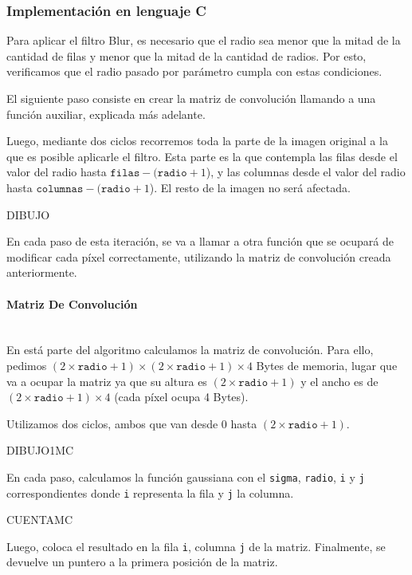     \subsubsection{Implementación en lenguaje C}

      Para aplicar el filtro Blur, es necesario que el radio sea menor que la mitad de la cantidad de filas y menor que la mitad de la cantidad de radios. Por esto, verificamos que el radio pasado por parámetro cumpla con estas condiciones.
      
      El siguiente paso consiste en crear la matriz de convolución llamando a una función auxiliar, explicada más adelante. 

      Luego, mediante dos ciclos recorremos toda la parte de  la imagen original a la que es posible aplicarle el filtro. Esta parte es la que contempla las filas desde el valor del radio hasta $\mathtt{filas} - (\mathtt{radio} + 1$), y las columnas desde el valor del radio hasta $\mathtt{columnas} - (\mathtt{radio} + 1$). El resto de la imagen no será afectada. 

      DIBUJO

      En cada paso de esta iteración, se va a llamar a otra función que se ocupará de modificar cada píxel correctamente, utilizando la matriz de convolución creada anteriormente. 

      \paragraph{Matriz De Convolución} \mbox{} \\
        En está parte del algoritmo calculamos la matriz de convolución. Para ello, pedimos $(2 \times \mathtt{radio} + 1) \times (2 \times \mathtt{radio} + 1) \times 4$ Bytes de memoria, lugar que va a ocupar la matriz ya que su altura es $(2 \times \mathtt{radio} + 1)$ y el ancho es de $(2 \times \mathtt{radio} + 1) \times 4$ (cada píxel ocupa 4 Bytes).
        
        Utilizamos dos ciclos, ambos que van desde 0 hasta $(2 \times \mathtt{radio} + 1)$. 
        
        DIBUJO1MC

        En cada paso, calculamos la función gaussiana con el \texttt{sigma}, \texttt{radio}, \texttt{i} y \texttt{j} correspondientes donde \texttt{i} representa la fila y \texttt{j} la columna.  
        
        CUENTAMC
    
        Luego, coloca el resultado en la fila \texttt{i}, columna \texttt{j} de la matriz. Finalmente, se devuelve un puntero a la primera posición de la matriz.

